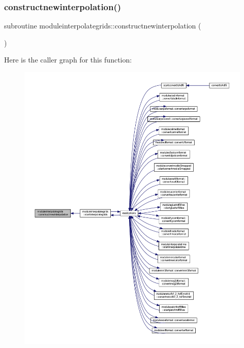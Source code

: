 \subsubsection{\texorpdfstring{constructnewinterpolation()}{constructnewinterpolation()}}
{\footnotesize\ttfamily subroutine moduleinterpolategrids\+::constructnewinterpolation (\begin{DoxyParamCaption}{ }\end{DoxyParamCaption})\hspace{0.3cm}{\ttfamily [private]}}

Here is the caller graph for this function\+:\nopagebreak
\begin{figure}[H]
\begin{center}
\leavevmode
\includegraphics[width=350pt]{namespacemoduleinterpolategrids_ad2efee291ef78f4157e38ef104255bc3_icgraph}
\end{center}
\end{figure}
\mbox{\label{namespacemoduleinterpolategrids_a57274a0561d59adfc89dec77051df3e4}} 
